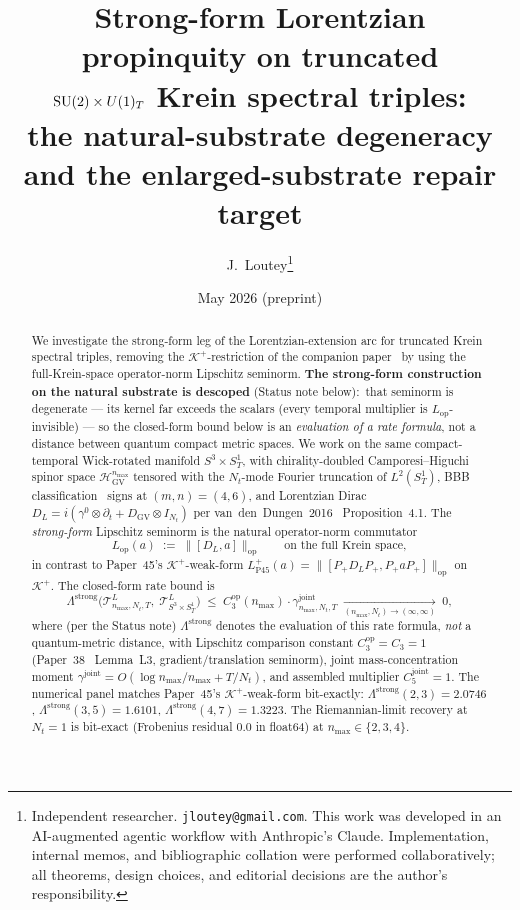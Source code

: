 \documentclass[11pt,a4paper]{article}
\title{Strong-form Lorentzian propinquity on truncated\\
$\mathrm{SU}(2)\times U(1)_{T}$ Krein spectral triples:\\
the natural-substrate degeneracy and the enlarged-substrate repair target}
\author{J.~Loutey\thanks{Independent researcher. \texttt{jloutey@gmail.com}.
This work was developed in an AI-augmented agentic workflow with
Anthropic's Claude. Implementation, internal memos, and bibliographic
collation were performed collaboratively; all theorems, design choices,
and editorial decisions are the author's responsibility.}}
\date{May 2026 (preprint)}
\theoremstyle{plain}
\theoremstyle{definition}
\newcommand{\nmax}{n_{\max}}
\newcommand{\Nt}{N_{t}}
\newcommand{\SoneT}{S^{1}_{T}}
\newcommand{\Manifold}{S^{3}\times S^{1}_{T}}
\newcommand{\Krein}{\mathcal{K}}
\newcommand{\Tcal}{\mathcal{T}}
\newcommand{\opnorm}[1]{\lVert #1 \rVert_{\mathrm{op}}}
\newcommand{\DGV}{D_{\mathrm{GV}}}
\newcommand{\DL}{D_{L}}
\newcommand{\Lprop}{\Lambda^{\mathrm{strong}}}
\newcommand{\Lop}{L_{\mathrm{op}}}
\newcommand{\LPwk}{L^{+}_{\mathrm{P45}}}
\newcommand{\gammajoint}{\gamma^{\mathrm{joint}}}
\newcommand{\Cthreeop}{C_{3}^{\mathrm{op}}}
\newcommand{\Cfivejoint}{C_{5}^{\mathrm{joint}}}
\newcommand{\HGV}{\mathcal{H}_{\mathrm{GV}}}
\newcommand{\Kplus}{\Krein^{+}}
\newcommand{\Pplus}{P_{+}}
\begin{document}
\maketitle

\begin{abstract}
We investigate the strong-form leg of the Lorentzian-extension arc for
truncated Krein spectral triples, removing the $\Kplus$-restriction of
the companion paper~\cite{paper45} by using the full-Krein-space
operator-norm Lipschitz seminorm. \textbf{The strong-form construction
on the natural substrate is descoped} (Status note below):\ that
seminorm is degenerate --- its kernel far exceeds the scalars (every
temporal multiplier is $\Lop$-invisible) --- so the closed-form bound
below is an \emph{evaluation of a rate formula}, not a distance between
quantum compact metric spaces. We work on the same
compact-temporal Wick-rotated manifold $\Manifold$, with chirality-doubled
Camporesi--Higuchi spinor space $\HGV^{\nmax}$ tensored with the
$\Nt$-mode Fourier truncation of $L^{2}(\SoneT)$, BBB
classification~\cite{bizi_brouder_besnard2018} signs at $(m, n) = (4, 6)$,
and Lorentzian Dirac
$\DL = i(\gamma^{0} \otimes \partial_{t} + \DGV \otimes I_{\Nt})$ per
van~den~Dungen~2016~\cite{vandungen2016} Proposition~4.1. The
\emph{strong-form} Lipschitz seminorm is the natural operator-norm
commutator
\begin{equation*}
   \Lop(a) \;:=\; \opnorm{[\DL, a]} \qquad \text{on the full Krein space},
\end{equation*}
in contrast to Paper~45's $\Kplus$-weak-form
$\LPwk(a) = \opnorm{[\Pplus \DL \Pplus, \Pplus a \Pplus]}$ on $\Kplus$.
The closed-form rate bound is
\begin{equation*}
   \Lprop\!\bigl(\Tcal^{L}_{\nmax,\Nt,T},\;
                 \Tcal^{L}_{\Manifold}\bigr)
   \;\le\; \Cthreeop(\nmax) \cdot \gammajoint_{\nmax,\Nt,T}
   \;\xrightarrow[(\nmax,\Nt)\to(\infty,\infty)]{}\; 0,
\end{equation*}
where (per the Status note) $\Lprop$ denotes the evaluation of this rate
formula, \emph{not} a quantum-metric distance,
with Lipschitz comparison constant $\Cthreeop = C_{3} = 1$
(Paper~38~\cite{paper38} Lemma~L3, gradient/translation seminorm),
joint mass-concentration moment
$\gammajoint = O(\log\nmax/\nmax + T/\Nt)$, and assembled multiplier
$\Cfivejoint = 1$. The numerical panel matches Paper~45's $\Kplus$-weak-form
bit-exactly: $\Lprop(2, 3) = 2.0746$, $\Lprop(3, 5) = 1.6101$,
$\Lprop(4, 7) = 1.3223$. The Riemannian-limit recovery at $\Nt = 1$ is
bit-exact (Frobenius residual $0.0$ in float64) at $\nmax \in \{2, 3, 4\}$.

\end{abstract}
\end{document}
